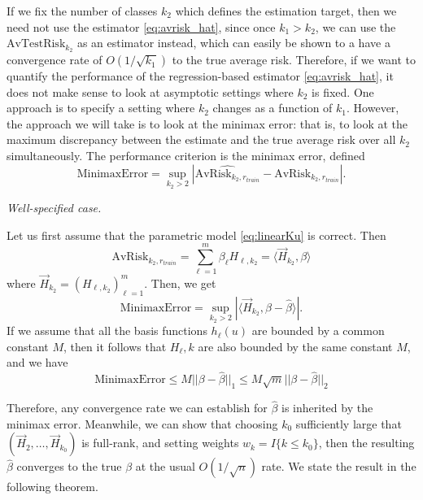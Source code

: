 If we fix the number of classes $k_2$ which defines the estimation
target, then we need not use the estimator \eqref{eq:avrisk_hat},
since once $k_1 > k_2$, we can use the $\text{AvTestRisk}_{k_2}$ as an
estimator instead, which can easily be shown to a have a convergence
rate of $O(1/\sqrt{k_1})$ to the true average risk.  Therefore, if we
want to quantify the performance of the regression-based
estimator \eqref{eq:avrisk_hat}, it does not make sense to look at
asymptotic settings where $k_2$ is fixed.  One approach is to specify
a setting where $k_2$ changes as a function of $k_1$.  However, the
approach we will take is to look at the minimax error: that is, to
look at the maximum discrepancy between the estimate and the true
average risk over all $k_2$ simultaneously.  The performance criterion
is the minimax error, defined
\begin{equation}\label{eq:minimax_error}
\text{MinimaxError} = \sup_{k_2 > 2} |\widehat{\text{AvRisk}_{k_2,r_{train}}} - \text{AvRisk}_{k_2,r_{train}}|.
\end{equation}

\noindent\emph{Well-specified case.}

Let us first assume that the parametric model \eqref{eq:linearKu} is correct. Then
\[
\text{AvRisk}_{k_2,r_{train}} = \sum_{\ell=1}^m \beta_\ell H_{\ell, k_2} = \langle \vec{H}_{k_2}, \beta \rangle
\]
where $\vec{H}_{k_2} = (H_{\ell, k_2})_{\ell=1}^m$.
Then, we get
\[
\text{MinimaxError} = \sup_{k_2 > 2} |\langle \vec{H}_{k_2}, \beta - \hat{\beta}\rangle|.
\]
If we assume that all the basis functions $h_\ell(u)$ are bounded by a
common constant $M$, then it follows that $H_\ell, k$ are also bounded by the same constant $M$,
and we have
\[
\text{MinimaxError} \leq M ||\beta - \hat{\beta}||_1 \leq M \sqrt{m}||\beta - \hat{\beta}||_2
\]

Therefore, any convergence rate we can establish for $\hat{\beta}$ is
inherited by the minimax error.  Meanwhile, we can show that choosing
$k_0$ sufficiently large that $(\vec{H}_2,\hdots,\vec{H}_{k_0})$ is
full-rank, and setting weights $w_k = I\{k \leq k_0\}$, then the
resulting $\hat{\beta}$ converges to the true $\beta$ at the usual
$O(1/\sqrt{n})$ rate.  We state the result in the following theorem.


